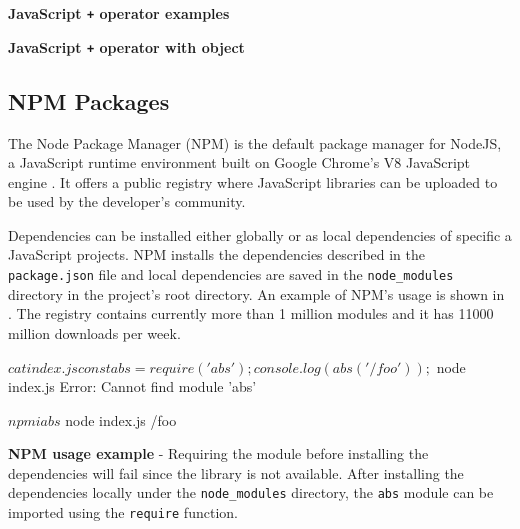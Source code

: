 \begin{code}
	\captionsetup{aboveskip=0pt, belowskip=10pt}
	\caption[JavaScript + operator examples]{\textbf{JavaScript \texttt{+} operator examples}}
	\label{code:background-plus-operator-simple-examples}
\end{code}

\begin{code}
	\captionsetup{aboveskip=0pt, belowskip=10pt}
	\caption[JavaScript + operator with object]{\textbf{JavaScript \texttt{+} operator with object}}
	\label{code:background-plus-operator-object-example}
\end{code}


\subsection{NPM Packages} \label{sec:background-npm-packages}
The Node Package Manager (NPM) is the default package manager for NodeJS, a JavaScript runtime environment built on Google Chrome's V8 JavaScript engine \citep{nodejs}. It offers a public registry where JavaScript libraries can be uploaded to be used by the developer's community.

Dependencies can be installed either globally or as local dependencies of specific a JavaScript projects. NPM installs the dependencies described in the \texttt{package.json} file and local dependencies are saved in the \texttt{node_modules} directory in the project's root directory. An example of NPM's usage is shown in . The registry contains currently more than 1 million modules and it has 11000 million downloads per week.

\begin{code}
	\begin{bashinline}
$ cat index.js 
const abs = require('abs');
console.log(abs('/foo'));

$ node index.js
Error: Cannot find module 'abs'

$ npm i abs
$ node index.js
/foo
	  \end{bashinline}
	\caption[NPM usage example]{\textbf{NPM usage example} - Requiring the module before installing the dependencies will fail since the library is not available. After installing the dependencies locally under the \texttt{node_modules} directory, the \texttt{abs} module can be imported using the \texttt{require} function.}
	\label{code:background-npm-usage-example}
  \end{code}

